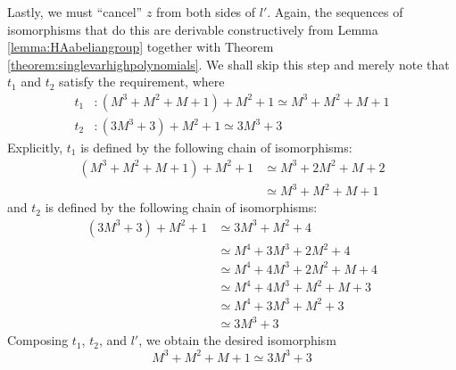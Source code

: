 \documentclass{msthesis}
\theoremstyle{definition}
\begin{document}
Lastly, we must ``cancel'' $z$ from both sides of $l'$.  Again, the sequences of isomorphisms that do this are derivable constructively from Lemma \ref{lemma:HAabeliangroup} together with Theorem \ref{theorem:singlevarhighpolynomials}. We shall skip this step and merely note that $t_1$ and $t_2$
satisfy the requirement, where
\begin{align*}
t_1 &: (M^3 + M^2 + M + 1) + M^2 + 1 \simeq M^3 + M^2  + M + 1 \\
t_2 &: (3M^3+3) + M^2 + 1 \simeq 3M^3 + 3
\end{align*}
Explicitly, $t_1$ is defined by the following chain of isomorphisms:
\begin{align*}
    (M^3 + M^2 + M + 1) + M^2 + 1
    &\simeq M^3 + 2M^2 + M + 2 \\
    &\simeq M^3 + M^2  + M + 1
\end{align*}
and $t_2$ is defined by the following chain of isomorphisms:
\begin{align*}
    (3M^3+3) + M^2 + 1
    &\simeq 3M^3 + M^2 + 4 \\
    &\simeq M^4 + 3M^3 + 2M^2 + 4 \\
    &\simeq M^4 + 4M^3 + 2M^2 + M + 4 \\
    &\simeq M^4 + 4M^3 + M^2 + M + 3 \\
    &\simeq M^4 + 3M^3 + M^2 + 3 \\
    &\simeq 3M^3 + 3
\end{align*}
Composing $t_1$, $t_2$, and $l'$, we obtain the desired isomorphism
\[ M^3 + M^2 + M + 1 \simeq 3M^3 + 3\]

\end{document}
